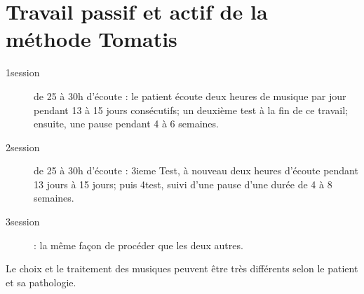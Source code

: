 \chapter{Travail passif et actif de la méthode Tomatis}

\begin{description}
\item [{1\iere session}] de 25 à 30h d'écoute : le patient écoute
deux heures de musique par jour pendant 13 à 15 jours consécutifs;
un deuxième test à la fin de ce travail; ensuite, une pause pendant
4 à 6 semaines.
\item [{2\ieme session}] de 25 à 30h d'écoute : 3ieme Test, à nouveau
deux heures d'écoute pendant 13 jours à 15 jours; puis 4\ieme test,
suivi d'une pause d'une durée de 4 à 8 semaines.
\item [{3\ieme session}] : la même façon de procéder que les deux
autres. 
\end{description}

Le choix et le traitement des musiques peuvent être très différents
selon le patient et sa pathologie.
